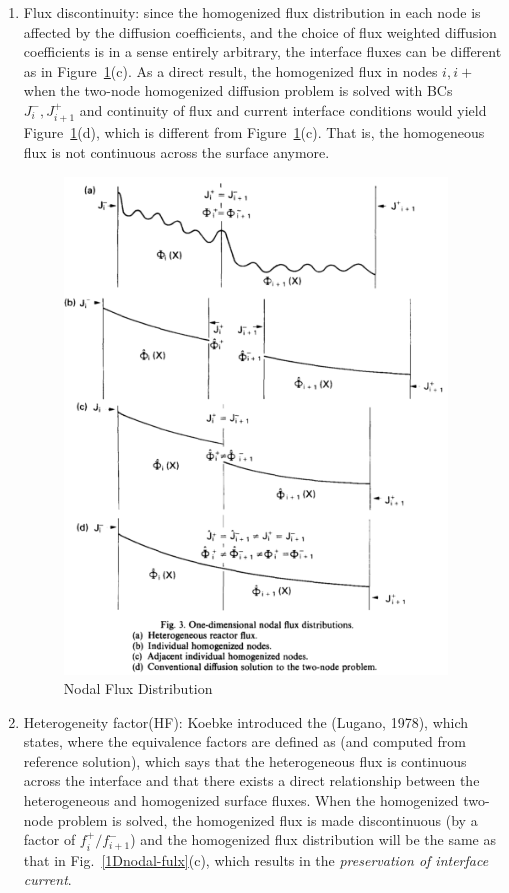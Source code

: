 \documentclass{school-22.211-notes}
\begin{document}
\begin{enumerate}
\item Flux discontinuity: since the homogenized flux distribution in each node is affected by the diffusion coefficients, and the choice of flux weighted diffusion coefficients is in a sense entirely arbitrary, the interface fluxes can be different as in Figure~\ref{1Dnodal-flux}(c). As a direct result, the homogenized flux in nodes $i, i+$ when the two-node homogenized diffusion problem is solved with BCs $J_i^-, J_{i+1}^+$ and continuity of flux and current interface conditions would yield Figure~\ref{1Dnodal-flux}(d), which is different from Figure~\ref{1Dnodal-flux}(c). That is, the homogeneous flux is not continuous across the surface anymore. 
\begin{figure}[ht]
  \centering
  \includegraphics[width=4in]{images/methd/1Dnodal-flux.png}
  \caption{Nodal Flux Distribution} \label{1Dnodal-flux}
\end{figure}

\item Heterogeneity factor(HF): Koebke introduced the (Lugano, 1978), which states,
where the equivalence factors are defined as (and computed from reference solution), 
which says that the heterogeneous flux is continuous across the interface and that there exists a direct relationship between the heterogeneous and homogenized surface fluxes. When the homogenized two-node problem is solved, the homogenized flux is made discontinuous (by a factor of $f_i^+/f_{i+1}^-$) and the homogenized flux distribution will be the same as that in Fig.~\ref{1Dnodal-fulx}(c), which results in the \textit{preservation of interface current}. 


\end{enumerate}
\end{document}
